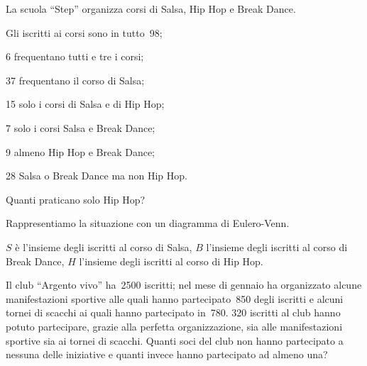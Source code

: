 \begin{esercizio}
\label{ese:7.25}
La scuola ``Step'' organizza corsi di Salsa, Hip Hop e Break Dance.

\begin{enumeratea}
\item Gli iscritti ai corsi sono in tutto~98;
\item 6 frequentano tutti e tre i corsi;
\item 37 frequentano il corso di Salsa;
\item 15 solo i corsi di Salsa e di Hip Hop;
\item 7 solo i corsi Salsa e Break Dance;
\item 9 almeno Hip Hop e Break Dance;
\item 28 Salsa o Break Dance ma non Hip Hop.
\end{enumeratea}

Quanti praticano solo Hip Hop?

Rappresentiamo la situazione con un diagramma di Eulero-Venn.
\begin{center}
 
\end{center}
$S$ è l'insieme degli iscritti al corso di Salsa, $B$ l'insieme degli iscritti 
al corso di
Break Dance, $H$ l'insieme degli iscritti al corso di Hip Hop.
\end{esercizio}

\begin{esercizio}
\label{ese:7.26}
Il club ``Argento vivo'' ha~2500 iscritti; nel mese di gennaio ha organizzato 
alcune
manifestazioni sportive alle quali hanno partecipato~850 degli iscritti
e alcuni tornei di scacchi ai quali hanno partecipato in~780. 320
iscritti al club hanno potuto partecipare, grazie alla perfetta
organizzazione, sia alle manifestazioni sportive sia ai tornei di
scacchi. Quanti soci del club non hanno partecipato a nessuna delle
iniziative e quanti invece hanno partecipato ad almeno una?
\end{esercizio}

